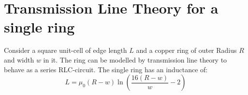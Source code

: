 \section{Transmission Line Theory for a single ring}
Consider a square unit-cell of edge length $L$ and a copper ring of outer Radius $R$ and width $w$ in it.
The ring can be modelled by transmission line theory to behave as a series RLC-circuit. 
The single ring has an inductance of:
\begin{equation}
L = \mu_0 (R-w) \ln\left(
\frac{16(R-w)}{w}-2
\right)
\end{equation}
